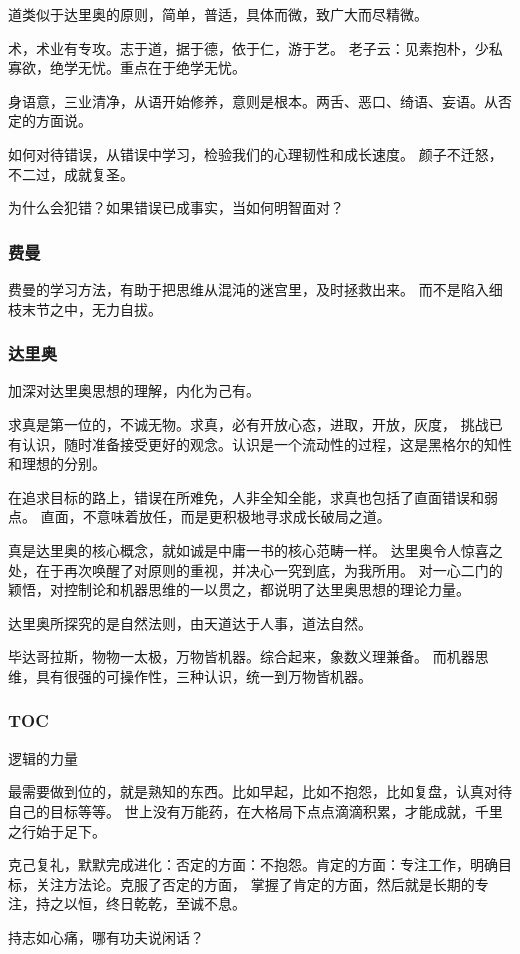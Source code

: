 道类似于达里奥的原则，简单，普适，具体而微，致广大而尽精微。

术，术业有专攻。志于道，据于德，依于仁，游于艺。
老子云：见素抱朴，少私寡欲，绝学无忧。重点在于绝学无忧。

身语意，三业清净，从语开始修养，意则是根本。两舌、恶口、绮语、妄语。从否定的方面说。

如何对待错误，从错误中学习，检验我们的心理韧性和成长速度。
颜子不迁怒，不二过，成就复圣。

为什么会犯错？如果错误已成事实，当如何明智面对？

\subsubsection{费曼}

费曼的学习方法，有助于把思维从混沌的迷宫里，及时拯救出来。
而不是陷入细枝末节之中，无力自拔。

\subsubsection{达里奥}

加深对达里奥思想的理解，内化为己有。

求真是第一位的，不诚无物。求真，必有开放心态，进取，开放，灰度，
挑战已有认识，随时准备接受更好的观念。认识是一个流动性的过程，这是黑格尔的知性和理想的分别。

在追求目标的路上，错误在所难免，人非全知全能，求真也包括了直面错误和弱点。
直面，不意味着放任，而是更积极地寻求成长破局之道。

真是达里奥的核心概念，就如诚是中庸一书的核心范畴一样。
达里奥令人惊喜之处，在于再次唤醒了对原则的重视，并决心一究到底，为我所用。
对一心二门的颖悟，对控制论和机器思维的一以贯之，都说明了达里奥思想的理论力量。

达里奥所探究的是自然法则，由天道达于人事，道法自然。

毕达哥拉斯，物物一太极，万物皆机器。综合起来，象数义理兼备。
而机器思维，具有很强的可操作性，三种认识，统一到万物皆机器。

\subsubsection{TOC}

逻辑的力量

最需要做到位的，就是熟知的东西。比如早起，比如不抱怨，比如复盘，认真对待自己的目标等等。
世上没有万能药，在大格局下点点滴滴积累，才能成就，千里之行始于足下。

克己复礼，默默完成进化：否定的方面：不抱怨。肯定的方面：专注工作，明确目标，关注方法论。克服了否定的方面，
掌握了肯定的方面，然后就是长期的专注，持之以恒，终日乾乾，至诚不息。

持志如心痛，哪有功夫说闲话？
